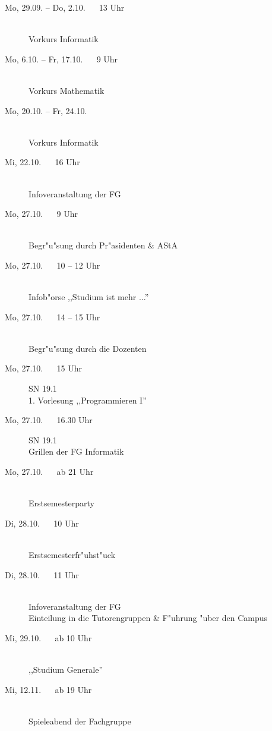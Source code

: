 \begin{description}
  \item[Mo, 29.09. -- Do, 2.10. ~~ 13 Uhr] \hfill {} \\
  Vorkurs Informatik
  \item[Mo, 6.10. -- Fr, 17.10. ~~ 9 Uhr] \hfill {} \\
  Vorkurs Mathematik
  \item[Mo, 20.10. -- Fr, 24.10.] \ \\
  Vorkurs Informatik\footnotemark[1]
  \item[Mi, 22.10. ~~ 16 Uhr] \ \\
  Infoveranstaltung der FG \\
  \item[Mo, 27.10. ~~ 9 Uhr] \hfill {} \\
  Begr"u"sung durch Pr"asidenten \& AStA
  \item[Mo, 27.10. ~~ 10 -- 12 Uhr] \hfill {} \\
  Infob"orse ,,Studium ist mehr ...''
  \item[Mo, 27.10. ~~ 14 -- 15 Uhr] \ \\
  Begr"u"sung durch die Dozenten
  \item[Mo, 27.10. ~~ 15 Uhr] SN 19.1 \\
  1. Vorlesung ,,Programmieren I''
  \item[Mo, 27.10. ~~ 16.30 Uhr] SN 19.1 \\
  Grillen der FG Informatik
  \item[Mo, 27.10. ~~ ab 21 Uhr] \hfill {} \\
  Erstsemesterparty
  \item[Di, 28.10. ~~ 10 Uhr] \hfill {} \\
  Erstsemesterfr"uhst"uck
  \item[Di, 28.10. ~~ 11 Uhr] \hfill {} \\
  Infoveranstaltung der FG \\
  Einteilung in die Tutorengruppen \& F"uhrung "uber den Campus
  \item[Mi, 29.10. ~~ ab 10 Uhr] \ \\
  ,,Studium Generale''
  \item[Mi, 12.11. ~~ ab 19 Uhr] \hfill {} \\
  Spieleabend der Fachgruppe
\end{description}



